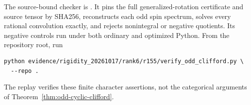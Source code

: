 The source-bound checker is
.
It pins the full generalized-rotation certificate and source tensor by
SHA256, reconstructs each odd spin spectrum, solves every rational
convolution exactly, and rejects nonintegral or negative quotients.
Its negative controls run under both ordinary and optimized Python.
From the repository root, run
\begin{verbatim}
python evidence/rigidity_20261017/rank6/r155/verify_odd_clifford.py \
  --repo .
\end{verbatim}
The replay verifies these finite character assertions, not the categorical
arguments of Theorem~\ref{thm:odd-cyclic-clifford}.
